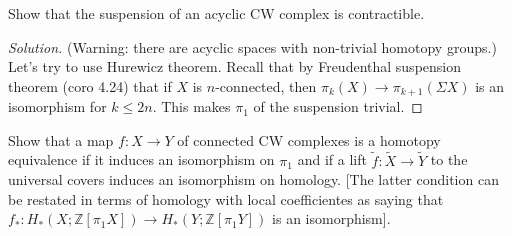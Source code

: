 \documentclass{article}
\numberwithin{equation}{section}
\newcommand{\Z}{\mathbb{Z}}
\begin{document}
\begin{exercise}[4.2.8]
	Show that the suspension of an acyclic CW complex is contractible.
\end{exercise}
\begin{proof}[Solution]
	(Warning: there are acyclic spaces with non-trivial homotopy groups.) Let's try to use Hurewicz theorem. Recall that by Freudenthal suspension theorem (coro 4.24) that if $X$ is $n$-connected, then $\pi_{k}(X)\to\pi_{k+1}(\Sigma X)$ is an isomorphism for $k\leq 2n$. This makes $\pi_1$ of the suspension trivial.
\end{proof}


\begin{exercise}[4.2.12]
	Show that a map $f:X\to Y$ of connected CW complexes is a homotopy equivalence if it induces an isomorphism on $\pi_1$ and if a lift $\widetilde{f}:\widetilde{X}\to \widetilde{Y}$ to the universal covers induces an isomorphism on homology. [The latter condition can be restated in terms of homology with local coefficientes as saying that $f_*:H_*(X;\Z[\pi_1X])\to H_*(Y;\Z[\pi_1Y])$ is an isomorphism]. 
\end{exercise}
\end{document}
